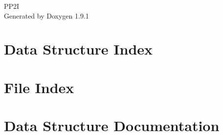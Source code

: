 \let\mypdfximage\pdfximage\def\pdfximage{\immediate\mypdfximage}\documentclass[twoside]{book}
\newcommand{\+}{\discretionary{\mbox{\scriptsize$\hookleftarrow$}}{}{}}
\newcommand{\clearemptydoublepage}{%
  \newpage{\pagestyle{empty}\cleardoublepage}%
}
\begin{document}
\raggedbottom

\hypersetup{pageanchor=false,
             bookmarksnumbered=true,
             pdfencoding=unicode
            }
\begin{titlepage}
\vspace*{7cm}
\begin{center}%
{\Large PP2I }\\
\vspace*{1cm}
{\large Generated by Doxygen 1.9.1}\\
\end{center}
\end{titlepage}
\clearemptydoublepage
{}
\tableofcontents
\clearemptydoublepage
{}
\hypersetup{pageanchor=true}

\chapter{Data Structure Index}

\chapter{File Index}

\chapter{Data Structure Documentation}






































\end{document}
